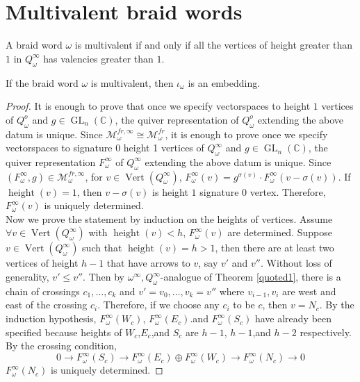 \section{Multivalent braid words}                            
\begin{definition}
 A braid word $\omega$ is multivalent if and only if all the vertices of height greater than $1$ in $Q^\infty_\omega$ has valencies greater than $1$.
\end{definition}

\begin{theorem}
	If the braid word $\omega$ is multivalent, then $\iota_{\omega}$ is an embedding.
\end{theorem}
\begin{proof}
It is enough to prove that once we specify vectorspaces to height $1$ vertices of $Q^o_\omega$ and $g\in \operatorname{GL}_n(\mathbb{C})$, the quiver representation of $Q^o_\omega$ extending the above datum is unique. Since $\mathcal{M}_\omega^{fr,\infty}\cong \mathcal{M}_\omega^{fr}$, it is enough to prove once we specify vectorspaces to signature 0 height 1 vertices of $Q_\omega^\infty$ and $g\in \operatorname{GL}_n(\mathbb{C})$, the quiver representation $F_\omega^\infty$ of $Q_\omega^\infty$ extending the above datum is unique. Since $(F_\omega^\infty,g)\in \mathcal{M}_\omega^{fr,\infty}$, for $v\in \operatorname{Vert}(Q_\omega^\infty)$, $F_\omega^\infty(v) = g^{\sigma(v)}\cdot F_\omega^\infty(v-\sigma(v))$. If $\operatorname{height}(v)=1$, then $v-\sigma(v)$ is height $1$ signature $0$ vertex. Therefore, $F_\omega^\infty(v)$ is uniquely determined. \\
Now we prove the statement by induction on the heights of vertices. Assume $\forall v\in \operatorname{Vert}(Q_\omega^\infty)$ with $\operatorname{height}(v)<h$, $F_\omega^\infty(v)$ are determined. Suppose $v\in \operatorname{Vert}(Q_\omega^\infty)$ such that $\operatorname{height}(v)=h>1$, then there are at least two vertices of height $h-1$ that have arrows to $v$, say $v'$ and $v''$. Without loss of generality, $v'\leq v''$. Then by $\omega^\infty,Q_\omega^\infty$-analogue of Theorem \ref{quoted1}, there is a chain of crossings $c_1,\dots,c_k$ and $v'=v_0,\dots,v_k=v''$ where $v_{i-1},v_i$ are west and east of the crossing $c_i$. Therefore, if we choose any $c_i$ to be $c$, then $v=N_c$. By the induction hypothesis, $F_\omega^\infty(W_c)$, $F_\omega^\infty(E_c)$.and $F_\omega^\infty(S_c)$ have already been specified because heights of $W_c$,$E_c$,and $S_c$ are $h-1$, $h-1$,and $h-2$ respectively. By the crossing condition,
\[
0\rightarrow F_\omega^\infty(S_c)\rightarrow F_\omega^\infty(E_c)\oplus F_\omega^\infty(W_c) \rightarrow F_\omega^\infty(N_c)\rightarrow 0
\]
$F_\omega^\infty(N_c)$ is uniquely determined.
\end{proof}

